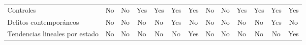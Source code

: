 {\begin{tabular}{l*{12}{c}}
Controles           &          No         &          No         &         Yes         &         Yes         &         Yes         &         Yes         &          No         &          No         &         Yes         &         Yes         &         Yes         &         Yes         \\
Delitos contemporáneos&          No         &          No         &          No         &          No         &         Yes         &          No         &          No         &          No         &          No         &          No         &         Yes         &          No         \\
Tendencias lineales por estado&          No         &          No         &          No         &          No         &          No         &         Yes         &          No         &          No         &          No         &          No         &          No         &         Yes         \\
\bottomrule
\end{tabular}
}
